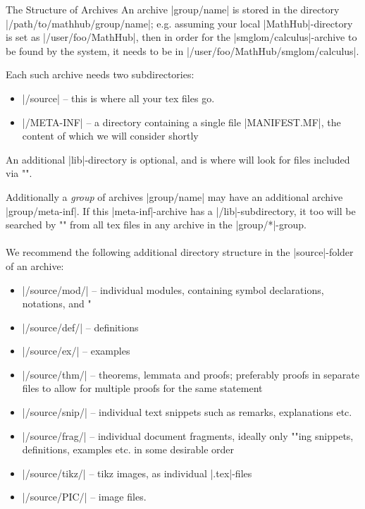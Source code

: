 \begin{sfragment}{The Structure of \sTeX Archives}
    An \sTeX archive |group/name| is stored in the
    directory |/path/to/mathhub/group/name|; e.g. assuming your
    local |MathHub|-directory is set as |/user/foo/MathHub|, then
    in order for the |smglom/calculus|-archive to be found by the
    \sTeX system, it needs to be in |/user/foo/MathHub/smglom/calculus|.

    Each such archive needs two subdirectories:
    \begin{itemize}
        \item |/source| -- this is where all your tex files go.
        \item |/META-INF| -- a directory containing a single file
            |MANIFEST.MF|, the content of which we will consider shortly
    \end{itemize}
    An additional |lib|-directory is optional, and is where \sTeX will
    look for files included via \stexcode"\libinput".

    Additionally a \emph{group} of archives |group/name| may have
    an additional archive |group/meta-inf|. If this |meta-inf|-archive
    has a |/lib|-subdirectory, it too will be searched by \stexcode"\libinput"
    from all tex files in any archive in the |group/*|-group.

    \paragraph{} We recommend the following additional directory structure in the
    |source|-folder of an \sTeX archive:
    \begin{itemize}
        \item |/source/mod/| -- individual \sTeX modules, containing
            symbol declarations, notations, and 
            \stexcode"\fi
        \item |/source/def/| -- definitions
        \item |/source/ex/| -- examples
        \item |/source/thm/| -- theorems, lemmata and proofs; preferably
            proofs in separate files to allow for multiple proofs for the
            same statement
        \item |/source/snip/| -- individual text snippets such as remarks,
            explanations etc.
        \item |/source/frag/| -- individual document fragments,
            ideally only \stexcode""ing snippets, definitions,
            examples etc. in some desirable order
        \item |/source/tikz/| -- tikz images, as individual |.tex|-files
        \item |/source/PIC/| -- image files.
    \end{itemize}

\end{sfragment}

